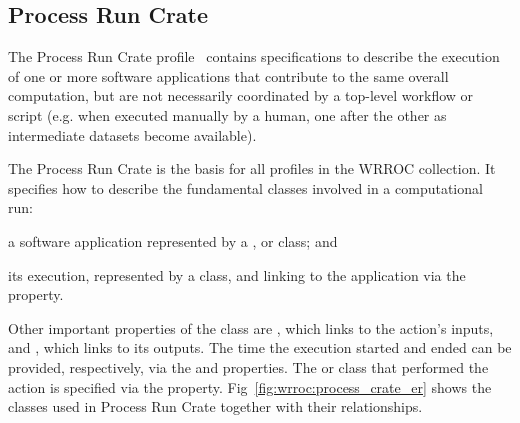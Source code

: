 \subsection{Process Run Crate}\label{wrroc:process-run-crate}

The Process Run Crate profile~\cite{WRROC 2024a} contains specifications to describe the execution of one or more software applications that contribute to the same overall computation, but are not necessarily coordinated by a top-level workflow or script (e.g. when executed manually by a human, one after the other as intermediate datasets become available).

The Process Run Crate is the basis for all profiles in the WRROC collection. It specifies how to describe the fundamental classes involved in a computational run: \begin{inlineenum}
\item a software application represented by a ,  or  class; and
\item its execution, represented by a  class, and linking to the application via the  property.
\end{inlineenum}
Other important properties of the
 class are , which links to the action's inputs, and , which links to its outputs.
The time the execution started and ended can be provided, respectively, via the
 and  properties.
The  or
 class that performed the action is specified via the  property.
Fig~\ref{fig:wrroc:process_crate_er} shows the classes used in Process Run Crate together with their relationships.


